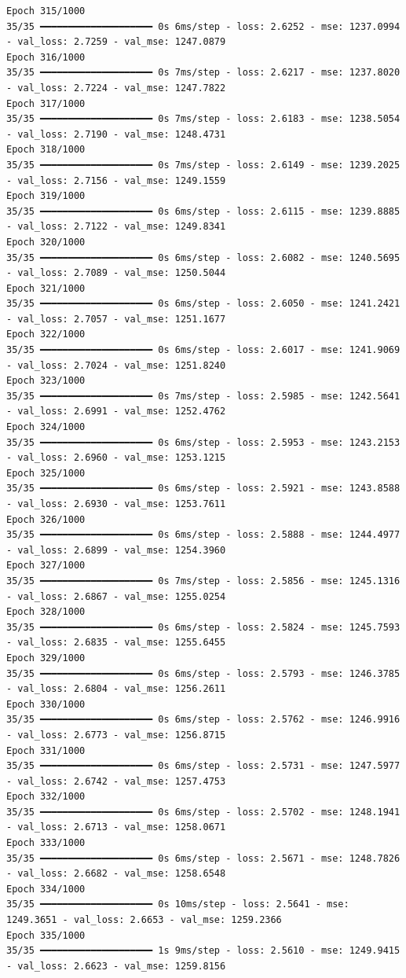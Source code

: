 \documentclass[
  letterpaper,
  DIV=11,
  numbers=noendperiod]{scrreprt}
\begin{document}
\begin{verbatim}
Epoch 315/1000
35/35 ━━━━━━━━━━━━━━━━━━━━ 0s 6ms/step - loss: 2.6252 - mse: 1237.0994 - val_loss: 2.7259 - val_mse: 1247.0879
Epoch 316/1000
35/35 ━━━━━━━━━━━━━━━━━━━━ 0s 7ms/step - loss: 2.6217 - mse: 1237.8020 - val_loss: 2.7224 - val_mse: 1247.7822
Epoch 317/1000
35/35 ━━━━━━━━━━━━━━━━━━━━ 0s 7ms/step - loss: 2.6183 - mse: 1238.5054 - val_loss: 2.7190 - val_mse: 1248.4731
Epoch 318/1000
35/35 ━━━━━━━━━━━━━━━━━━━━ 0s 7ms/step - loss: 2.6149 - mse: 1239.2025 - val_loss: 2.7156 - val_mse: 1249.1559
Epoch 319/1000
35/35 ━━━━━━━━━━━━━━━━━━━━ 0s 6ms/step - loss: 2.6115 - mse: 1239.8885 - val_loss: 2.7122 - val_mse: 1249.8341
Epoch 320/1000
35/35 ━━━━━━━━━━━━━━━━━━━━ 0s 6ms/step - loss: 2.6082 - mse: 1240.5695 - val_loss: 2.7089 - val_mse: 1250.5044
Epoch 321/1000
35/35 ━━━━━━━━━━━━━━━━━━━━ 0s 6ms/step - loss: 2.6050 - mse: 1241.2421 - val_loss: 2.7057 - val_mse: 1251.1677
Epoch 322/1000
35/35 ━━━━━━━━━━━━━━━━━━━━ 0s 6ms/step - loss: 2.6017 - mse: 1241.9069 - val_loss: 2.7024 - val_mse: 1251.8240
Epoch 323/1000
35/35 ━━━━━━━━━━━━━━━━━━━━ 0s 7ms/step - loss: 2.5985 - mse: 1242.5641 - val_loss: 2.6991 - val_mse: 1252.4762
Epoch 324/1000
35/35 ━━━━━━━━━━━━━━━━━━━━ 0s 6ms/step - loss: 2.5953 - mse: 1243.2153 - val_loss: 2.6960 - val_mse: 1253.1215
Epoch 325/1000
35/35 ━━━━━━━━━━━━━━━━━━━━ 0s 6ms/step - loss: 2.5921 - mse: 1243.8588 - val_loss: 2.6930 - val_mse: 1253.7611
Epoch 326/1000
35/35 ━━━━━━━━━━━━━━━━━━━━ 0s 6ms/step - loss: 2.5888 - mse: 1244.4977 - val_loss: 2.6899 - val_mse: 1254.3960
Epoch 327/1000
35/35 ━━━━━━━━━━━━━━━━━━━━ 0s 7ms/step - loss: 2.5856 - mse: 1245.1316 - val_loss: 2.6867 - val_mse: 1255.0254
Epoch 328/1000
35/35 ━━━━━━━━━━━━━━━━━━━━ 0s 6ms/step - loss: 2.5824 - mse: 1245.7593 - val_loss: 2.6835 - val_mse: 1255.6455
Epoch 329/1000
35/35 ━━━━━━━━━━━━━━━━━━━━ 0s 6ms/step - loss: 2.5793 - mse: 1246.3785 - val_loss: 2.6804 - val_mse: 1256.2611
Epoch 330/1000
35/35 ━━━━━━━━━━━━━━━━━━━━ 0s 6ms/step - loss: 2.5762 - mse: 1246.9916 - val_loss: 2.6773 - val_mse: 1256.8715
Epoch 331/1000
35/35 ━━━━━━━━━━━━━━━━━━━━ 0s 6ms/step - loss: 2.5731 - mse: 1247.5977 - val_loss: 2.6742 - val_mse: 1257.4753
Epoch 332/1000
35/35 ━━━━━━━━━━━━━━━━━━━━ 0s 6ms/step - loss: 2.5702 - mse: 1248.1941 - val_loss: 2.6713 - val_mse: 1258.0671
Epoch 333/1000
35/35 ━━━━━━━━━━━━━━━━━━━━ 0s 6ms/step - loss: 2.5671 - mse: 1248.7826 - val_loss: 2.6682 - val_mse: 1258.6548
Epoch 334/1000
35/35 ━━━━━━━━━━━━━━━━━━━━ 0s 10ms/step - loss: 2.5641 - mse: 1249.3651 - val_loss: 2.6653 - val_mse: 1259.2366
Epoch 335/1000
35/35 ━━━━━━━━━━━━━━━━━━━━ 1s 9ms/step - loss: 2.5610 - mse: 1249.9415 - val_loss: 2.6623 - val_mse: 1259.8156

\end{verbatim}
\end{document}
